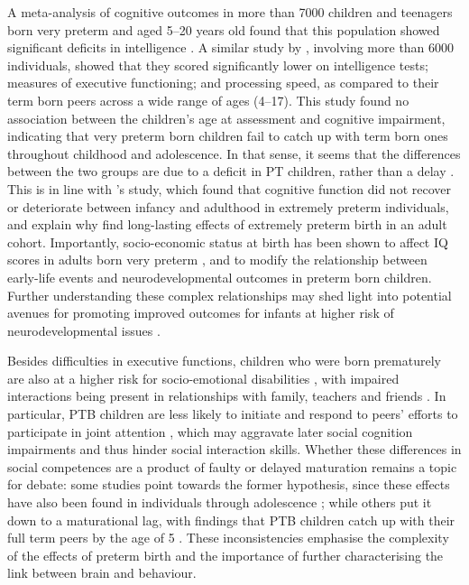 A meta-analysis of cognitive outcomes in more than 7000 children and teenagers born very preterm and aged 5--20 years old found that this population showed significant deficits in intelligence \cite{Twilhaar2018}. A similar study by \citet{Brydges2018}, involving more than 6000 individuals, showed that they scored significantly lower on intelligence tests; measures of executive functioning; and processing speed, as compared to their term born peers across a wide range of ages (4--17). This study found no association between the children's age at assessment and cognitive impairment, indicating that very preterm born children fail to catch up with term born ones throughout childhood and adolescence. In that sense, it seems that the differences between the two groups are due to a deficit in PT children, rather than a delay \citep{Brydges2018}. This is in line with \citep{Linsell2018}'s study, which found that cognitive function did not recover or deteriorate between infancy and adulthood in extremely preterm individuals, and explain why \cite{Doyle2010} find long-lasting effects of extremely preterm birth in an adult cohort. Importantly, socio-economic status at birth has been shown to affect IQ scores in adults born very preterm \citep{Breeman2017}, and to modify the relationship between early-life events and neurodevelopmental outcomes in preterm born children. Further understanding these complex relationships may shed light into potential avenues for promoting improved outcomes for infants at higher risk of neurodevelopmental issues \citep{Benavente-Fernandez2020}. 

Besides difficulties in executive functions, children who were born prematurely are also at a higher risk for socio-emotional disabilities \citep{Zmyj2017}, with impaired interactions being present in relationships with family, teachers and friends \citep{Twilhaar2019}. In particular, PTB children are less likely to initiate and respond to peers' efforts to participate in joint attention \citep{Zmyj2017}, which may aggravate later social cognition impairments and thus hinder social interaction skills. Whether these differences in social competences are a product of faulty or delayed maturation remains a topic for debate: some studies point towards the former hypothesis, since these effects have also been found in individuals through adolescence  \citep{Healy2013, Saigal2016}; while others put it down to a maturational lag, with findings that PTB children catch up with their full term peers by the age of 5 \citep{Witt2018}. These inconsistencies emphasise the complexity of the effects of preterm birth and the importance of further characterising the link between brain and behaviour.

